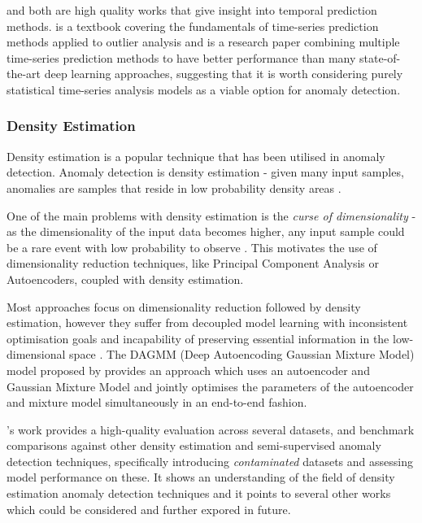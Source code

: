 \documentclass{mproj}
\begin{document}
\cite{outlierAnalysisBook} and \cite{ADSaS} both are high quality works that give insight into temporal prediction methods. \cite{outlierAnalysisBook} is a textbook covering the fundamentals of time-series prediction methods applied to outlier analysis and \cite{ADSaS} is a research paper combining multiple time-series prediction methods to have better performance than many state-of-the-art deep learning approaches, suggesting that it is worth considering purely statistical time-series analysis models as a viable option for anomaly detection.

\subsubsection{Density Estimation}

Density estimation is a popular technique that has been utilised in anomaly detection. Anomaly detection is density estimation - given many input samples, anomalies are samples that reside in low probability density areas \citep{DAGMM}.

One of the main problems with density estimation is the \textit{curse of dimensionality} - as the dimensionality of the input data becomes higher, any input sample could be a rare event with low probability to observe \citep{DAGMM}. This motivates the use of dimensionality reduction techniques, like Principal Component Analysis or Autoencoders, coupled with density estimation.

Most approaches focus on dimensionality reduction followed by density estimation, however they suffer from decoupled model learning with inconsistent optimisation goals and incapability of preserving essential information in the low-dimensional space \citep{DAGMM}. The DAGMM (Deep Autoencoding Gaussian Mixture Model) model proposed by \cite{DAGMM} provides an approach which uses an autoencoder and Gaussian Mixture Model and jointly optimises the parameters of the autoencoder and mixture model simultaneously in an end-to-end fashion. 

\cite{DAGMM}'s work provides a high-quality evaluation across several datasets, and benchmark comparisons against other density estimation and semi-supervised anomaly detection techniques, specifically introducing \textit{contaminated} datasets and assessing model performance on these. It shows an understanding of the field of density estimation anomaly detection techniques and it points to several other works which could be considered and further expored in future.
\end{document}
